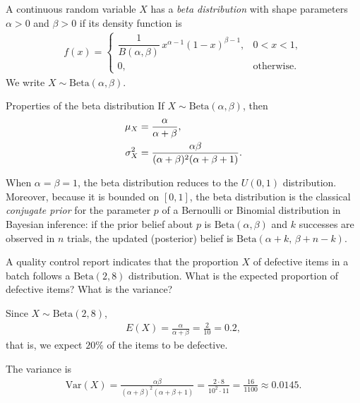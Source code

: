 \begin{definicion}
A continuous random variable $X$ has a \emph{beta distribution} with shape parameters
$\alpha > 0$ and $\beta > 0$ if its density function is
\begin{align}
 \label{eq:2.8.17}
 f(x) =
 \begin{cases}
  \dfrac{1}{B(\alpha,\beta)}\,x^{\alpha-1}(1-x)^{\beta-1}, & 0 < x < 1, \\
  0, & \text{otherwise.}
 \end{cases}
\end{align}
We write $X \sim \text{Beta}(\alpha,\beta)$.
\end{definicion}

{Properties of the beta distribution} If $X \sim \text{Beta}(\alpha,\beta)$, then
\begin{align}
 \mu_X &= \frac{\alpha}{\alpha+\beta}, \\
 \sigma_X^2 &= \frac{\alpha\beta}{(\alpha+\beta)^2(\alpha+\beta+1)}.
\end{align}

\begin{observacion}
When $\alpha=\beta=1$, the beta distribution reduces to the $U(0,1)$ distribution.
Moreover, because it is bounded on $[0,1]$, the beta distribution is the classical
\emph{conjugate prior} for the parameter $p$ of a Bernoulli or Binomial distribution in
Bayesian inference: if the prior belief about $p$ is $\text{Beta}(\alpha,\beta)$ and $k$
successes are observed in $n$ trials, the updated (posterior) belief is
$\text{Beta}(\alpha+k,\, \beta+n-k)$.
\end{observacion}

\begin{ejemplo}
 \label{exmp:2.8.7}
A quality control report indicates that the proportion $X$ of defective items in a batch
follows a $\text{Beta}(2,8)$ distribution. What is the expected proportion of defective
items? What is the variance?
\end{ejemplo}

\begin{solucion}
Since $X \sim \text{Beta}(2,8)$,
\begin{align}
 E(X) = \frac{\alpha}{\alpha+\beta} = \frac{2}{10} = 0.2,
\end{align}
that is, we expect $20\%$ of the items to be defective.

The variance is
\begin{align}
 \text{Var}(X) = \frac{\alpha\beta}{(\alpha+\beta)^2(\alpha+\beta+1)}
 = \frac{2\cdot 8}{10^2 \cdot 11} = \frac{16}{1100} \approx 0.0145.
\end{align}
\end{solucion}

